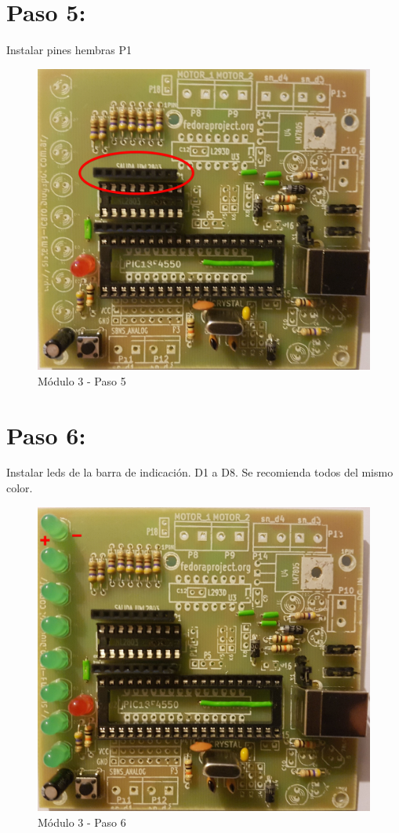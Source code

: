 \newpage
\section{Paso 5:}

Instalar pines hembras P1

\begin{figure}[h]
	\centering
	\includegraphics[width=0.8\linewidth]{Modulo_3/M3_5}
	\caption{Módulo 3 - Paso 5}
	\label{fig:M3_5}
\end{figure}

\newpage

\section{Paso 6:}

Instalar leds de la barra de indicación. D1 a D8. Se recomienda todos del mismo color.

\begin{figure}[h]
	\centering
	\includegraphics[width=0.8\linewidth]{Modulo_3/M3_6}
	\caption{Módulo 3 - Paso 6}
	\label{fig:M3_6}
\end{figure}


